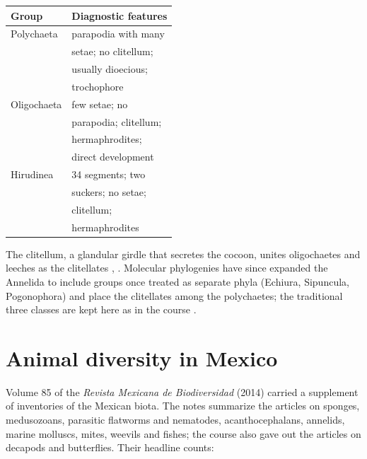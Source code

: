 \begin{center}
\begin{tabular}{ll}
Group & Diagnostic features \\
\hline
Polychaeta & parapodia with many \\
& setae; no clitellum; \\
& usually dioecious; \\
& trochophore \\
Oligochaeta & few setae; no \\
& parapodia; clitellum; \\
& hermaphrodites; \\
& direct development \\
Hirudinea & 34 segments; two \\
& suckers; no setae; \\
& clitellum; \\
& hermaphrodites \\
\end{tabular}
\end{center}

The clitellum, a glandular girdle that
secretes the cocoon, unites oligochaetes and
leeches as the clitellates
\cite{oceguera2014euhirudinea},
\cite{fragoso2014oligochaeta}. Molecular
phylogenies have since expanded the Annelida
to include groups once treated as separate
phyla (Echiura, Sipuncula, Pogonophora) and
place the clitellates among the polychaetes;
the traditional three classes are kept here
as in the course
\cite{tovarhernandez2014polychaeta}.

\section{Animal diversity in Mexico}
\label{section-mexico}

Volume 85 of the \emph{Revista Mexicana de
Biodiversidad} (2014) carried a supplement of
inventories of the Mexican biota. The notes
summarize the articles on sponges,
medusozoans, parasitic flatworms and
nematodes, acanthocephalans, annelids, marine
molluscs, mites, weevils and fishes; the
course also gave out the articles on decapods
and butterflies. Their headline counts:

